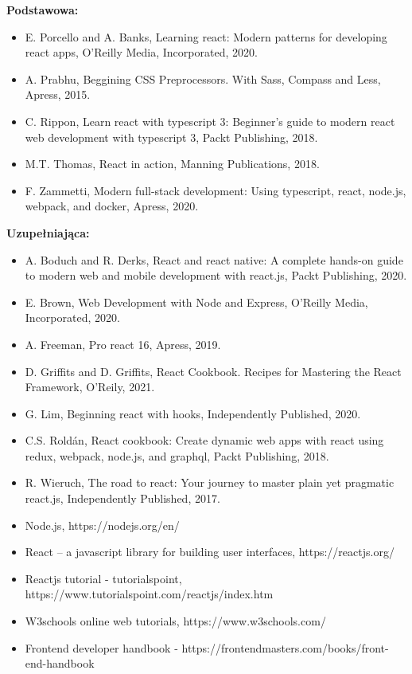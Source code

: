 \documentclass[12pt, a4paper]{article}
\begin{document}
\textbf{Podstawowa:}
\begin{itemize}
  \item E. Porcello and A. Banks, Learning react: Modern patterns for developing react apps, O’Reilly Media, Incorporated, 2020.
  \item A. Prabhu, Beggining CSS Preprocessors. With Sass, Compass and Less, Apress, 2015.
  \item C. Rippon, Learn react with typescript 3: Beginner’s guide to modern react web development with typescript 3, Packt Publishing, 2018.
  \item M.T. Thomas, React in action, Manning Publications, 2018.
  \item F. Zammetti, Modern full-stack development: Using typescript, react, node.js, webpack, and docker, Apress, 2020.
\end{itemize}

\textbf{Uzupełniająca:}
\begin{itemize}
  \item A. Boduch and R. Derks, React and react native: A complete hands-on guide to modern web and mobile development with react.js, Packt Publishing, 2020.
  \item E. Brown, Web Development with Node and Express, O'Reilly Media, Incorporated, 2020.
  \item A. Freeman, Pro react 16, Apress, 2019.
  \item D. Griffits and D. Griffits, React Cookbook. Recipes for Mastering the React Framework, O'Reily, 2021.
  \item G. Lim, Beginning react with hooks, Independently Published, 2020.
  \item C.S. Roldán, React cookbook: Create dynamic web apps with react using redux, webpack, node.js, and graphql, Packt Publishing, 2018.
  \item R. Wieruch, The road to react: Your journey to master plain yet pragmatic react.js, Independently Published, 2017.
  \item Node.js, https://nodejs.org/en/
  \item React – a javascript library for building user interfaces, https://reactjs.org/
  \item Reactjs tutorial - tutorialspoint, https://www.tutorialspoint.com/reactjs/index.htm
  \item W3schools online web tutorials, https://www.w3schools.com/
  \item Frontend developer handbook - https://frontendmasters.com/books/front-end-handbook
\end{itemize}
\end{document}
